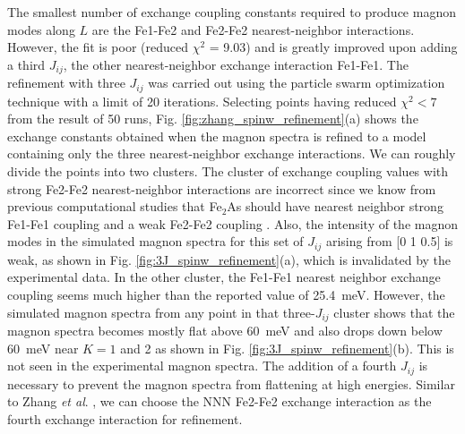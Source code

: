 \documentclass[10pt,doublespacing,edeposit]{uiucthesis2020}
\begin{document}
\begin{mainmatter}
The smallest number of exchange coupling constants required to produce magnon modes along $L$ are the Fe1-Fe2 and Fe2-Fe2 nearest-neighbor interactions. However, the fit is poor (reduced $\chi^2$ = 9.03) and is greatly improved upon adding a third $J_{ij}$, the other nearest-neighbor exchange interaction Fe1-Fe1. 
The refinement with three $J_{ij}$ was carried out using the particle swarm optimization technique with a limit of 20 iterations.
Selecting points having reduced $\chi^2 < 7$  from the result of 50 runs, Fig. \ref{fig:zhang_spinw_refinement}(a) shows the exchange constants obtained when the magnon spectra is refined to a model containing only the three nearest-neighbor exchange interactions. 
We can roughly divide the points into two clusters. The cluster of exchange coupling values with strong Fe2-Fe2 nearest-neighbor interactions are incorrect since we know from previous computational studies that Fe$_2$As should have nearest neighbor strong Fe1-Fe1 coupling and a weak Fe2-Fe2 coupling \cite{Zhang2013}. Also, the intensity of the magnon modes in the simulated magnon spectra for this set of $J_{ij}$ arising from [0 1 0.5] is weak, as shown in Fig. \ref{fig:3J_spinw_refinement}(a), which is invalidated by the experimental data. In the other cluster, the Fe1-Fe1 nearest neighbor exchange coupling seems much higher than the reported value of 25.4~meV. However, the simulated magnon spectra from any point in that three-$J_{ij}$ cluster shows that the magnon spectra becomes mostly flat above 60~meV and also drops down below 60~meV near $K = 1$ and 2 as shown in Fig. \ref{fig:3J_spinw_refinement}(b). This is not seen in the experimental magnon spectra. The addition of a fourth $J_{ij}$ is necessary to prevent the magnon spectra from flattening at high energies. Similar to Zhang \emph{et al}. \cite{Zhang2013}, we can choose the NNN Fe2-Fe2 exchange interaction as the fourth exchange interaction for refinement.



\end{mainmatter}
\end{document}

